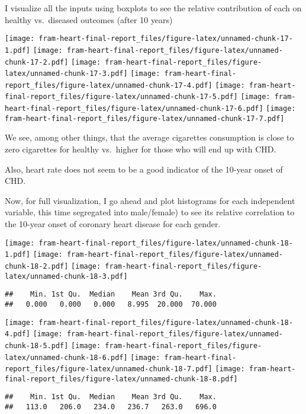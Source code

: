 \documentclass[]{article}
\begin{document}
I visualize all the inputs using boxplots to see the relative
contribution of each on healthy vs.~diseased outcomes (after 10 years)

\texttt{[image: fram-heart-final-report\_files/figure-latex/unnamed-chunk-17-1.pdf]}
\texttt{[image: fram-heart-final-report\_files/figure-latex/unnamed-chunk-17-2.pdf]}
\texttt{[image: fram-heart-final-report\_files/figure-latex/unnamed-chunk-17-3.pdf]}
\texttt{[image: fram-heart-final-report\_files/figure-latex/unnamed-chunk-17-4.pdf]}
\texttt{[image: fram-heart-final-report\_files/figure-latex/unnamed-chunk-17-5.pdf]}
\texttt{[image: fram-heart-final-report\_files/figure-latex/unnamed-chunk-17-6.pdf]}
\texttt{[image: fram-heart-final-report\_files/figure-latex/unnamed-chunk-17-7.pdf]}

We see, among other things, that the average cigarettes consumption is
close to zero cigarettes for healthy vs.~higher for those who will end
up with CHD.

Also, heart rate does not seem to be a good indicator of the 10-year
onset of CHD.

Now, for full visualization, I go ahead and plot histograms for each
independent variable, this time segregated into male/female) to see its
relative correlation to the 10-year onset of coronary heart disease for
each gender.

\texttt{[image: fram-heart-final-report\_files/figure-latex/unnamed-chunk-18-1.pdf]}
\texttt{[image: fram-heart-final-report\_files/figure-latex/unnamed-chunk-18-2.pdf]}
\texttt{[image: fram-heart-final-report\_files/figure-latex/unnamed-chunk-18-3.pdf]}

\begin{verbatim}
##    Min. 1st Qu.  Median    Mean 3rd Qu.    Max. 
##   0.000   0.000   0.000   8.995  20.000  70.000
\end{verbatim}

\texttt{[image: fram-heart-final-report\_files/figure-latex/unnamed-chunk-18-4.pdf]}
\texttt{[image: fram-heart-final-report\_files/figure-latex/unnamed-chunk-18-5.pdf]}
\texttt{[image: fram-heart-final-report\_files/figure-latex/unnamed-chunk-18-6.pdf]}
\texttt{[image: fram-heart-final-report\_files/figure-latex/unnamed-chunk-18-7.pdf]}
\texttt{[image: fram-heart-final-report\_files/figure-latex/unnamed-chunk-18-8.pdf]}

\begin{verbatim}
##    Min. 1st Qu.  Median    Mean 3rd Qu.    Max. 
##   113.0   206.0   234.0   236.7   263.0   696.0
\end{verbatim}
\end{document}
